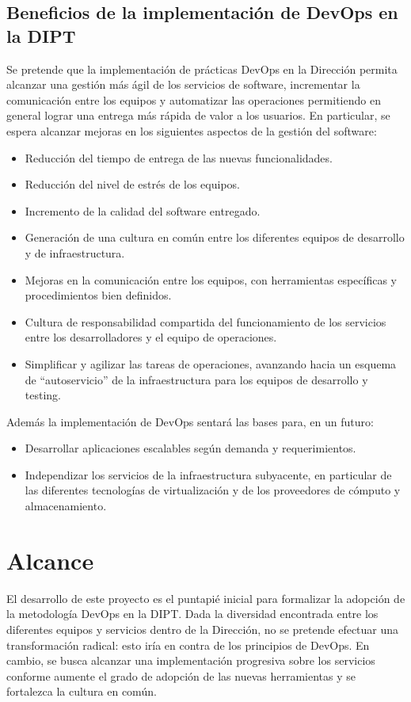 \subsection{Beneficios de la implementación de DevOps en la DIPT}
%
Se pretende que la implementación de prácticas DevOps en la Dirección
permita alcanzar una gestión más ágil de los servicios de software,
incrementar la comunicación entre los equipos y automatizar las
operaciones permitiendo en general lograr una entrega más rápida de
valor a los usuarios. En particular, se espera alcanzar mejoras en los
siguientes aspectos de la gestión del software:
%
\begin{itemize}
\item Reducción del tiempo de entrega de las nuevas funcionalidades.
\item Reducción del nivel de estrés de los equipos.
\item Incremento de la calidad del software entregado.
\item Generación de una cultura en común entre los diferentes equipos
  de desarrollo y de infraestructura.
\item Mejoras en la comunicación entre los equipos, con herramientas
  específicas y procedimientos bien definidos.
\item Cultura de responsabilidad compartida del funcionamiento de los
  servicios entre los desarrolladores y el equipo de operaciones.
\item Simplificar y agilizar las tareas de operaciones, avanzando
  hacia un esquema de ``autoservicio'' de la infraestructura para los
  equipos de desarrollo y testing.
\end{itemize}
%
Además la implementación de DevOps sentará las bases para, en un
futuro:
%
\begin{itemize}
\item Desarrollar aplicaciones escalables según demanda y
  requerimientos.
\item Independizar los servicios de la infraestructura subyacente, en
  particular de las diferentes tecnologías de virtualización y de los
  proveedores de cómputo y almacenamiento.
\end{itemize}
%
%
\section{Alcance}
%
El desarrollo de este proyecto es el puntapié inicial para formalizar
la adopción de la metodología DevOps en la DIPT. Dada la diversidad
encontrada entre los diferentes equipos y servicios dentro de la
Dirección, no se pretende efectuar una transformación radical: esto
iría en contra de los principios de DevOps. En cambio, se busca
alcanzar una implementación progresiva sobre los servicios conforme
aumente el grado de adopción de las nuevas herramientas y se
fortalezca la cultura en común.
%
%
